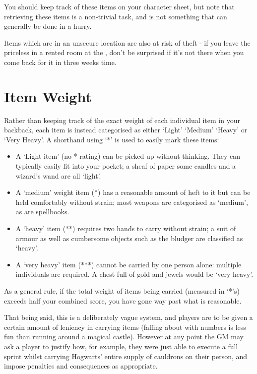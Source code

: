 You should keep track of these items on your character sheet, but note that retrieving these items is a non-trivial task, and is not something that can generally be done in a hurry. 

Items which are  in an unsecure location are also at risk of theft - if you leave the priceless  in a rented room at the , don't be surprised if it's not there when you come back for it in three weeks time. 



\section{Item Weight}\label{S:ItemAbstraction}

Rather than keeping track of the exact weight of each individual item in your backback\comma{}, each item is instead categorised as either `Light'\comma{} `Medium'\comma{} `Heavy' or `Very Heavy'. A shorthand using `*' is used to easily mark these items:
\begin{itemize}[itemsep = 0pt]
\item A `Light item' (no * rating) can be picked up without thinking. They can typically easily fit into your pocket; a sheaf of paper\comma{} some candles and a wizard's wand are all `light'. 

\item A `medium' weight item (*) has a reasonable amount of heft to it\comma{} but can be held comfortably without strain; most weapons are categorised as `medium', as are spellbooks.

\item A `heavy' item (**) requires two hands to carry without strain; a suit of armour\comma{} as well as cumbersome objects such as the bludger are classified as `heavy'.

\item A `very heavy' item (***) cannot be carried by one person alone: multiple individuals are required. A chest full of gold and jewels would be `very heavy'. 
\end{itemize}
As a general rule, if the total weight of items being carried (measured in `*'s) exceeds half your combined  score, you have gone way past what is reasonable.  

That being said, this is a deliberately vague system, and players are to be given a certain amount of leniency in carrying items (faffing about with numbers is less fun than running around a magical castle). However at any point the GM may ask a player to justify how, for example, they were just able to execute a full sprint whilst carrying Hogwarts' entire supply of cauldrons on their person, and impose penalties and consequences as appropriate. 




